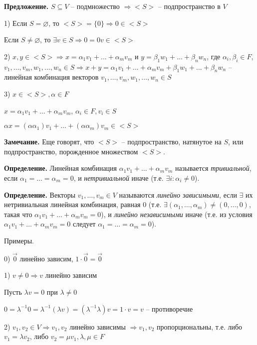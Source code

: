 \bigskip
\textbf{Предложение.} $S \subseteq V$ -- подмножество $\Rightarrow <S>$ -- подпространство в $V$

1) Если $S = \varnothing$, то $<S> = \{0\} \Rightarrow 0 \in <S>$

Если $S \neq \varnothing$, то $\exists v \in S \Rightarrow 0 = 0 v \in <S>$

2) $x, y \in <S> \Rightarrow x = \alpha_1 v_1 + \dots + \alpha_m v_m$ и $y = \beta_1 w_1 + \dots + \beta_n w_n$, где $\alpha_i, \beta_i \in F$, $v_1, \dots, v_m, w_1, \dots, w_n \in S \Rightarrow x + y = \alpha_1 v_1 + \dots + \alpha_m v_m + \beta_1 w_1 + \dots + \beta_n w_n$ -- линейная комбинация векторов $v_1, \dots, v_m, w_1, \dots, w_n \in S$

3) $x \in <S>, \alpha \in F$

$x = \alpha_1 v_1 + \dots + \alpha_m v_m$, $\alpha_i \in F, v_i \in S$

$\alpha x = (\alpha \alpha_1)v_1 + \dots + (\alpha \alpha_m) v_m \in <S>$

\bigskip
\textbf{Замечание.} Еще говорят, что $<S>$ -- подпространство, натянутое на $S$, или подпространство, порожденное множеством $<S>$.

\bigskip
\textbf{Определение.} Линейная комбинация $\alpha_1 v_1 + \dots + \alpha_m v_m$ называется \textit{тривиальной}, если $\alpha_1 = \dots = \alpha_m = 0$, и \textit{нетривиальной} иначе (т.е. $\exists i: \alpha_i \neq 0$).

\bigskip
\textbf{Определение.} Векторы $v_1, \dots, v_m \in V$ называются \textit{линейно зависимыми}, если $\exists$ их нетривиальная линейная комбинация, равная 0 (т.е. $\exists (\alpha_1, \dots, \alpha_m) \neq (0, \dots, 0)$, такая что $\alpha_1 v_1 + \dots + \alpha_m v_m = 0$), и \textit{линейно независимыми} иначе (т.е. из условия $\alpha_1 v_1 + \dots + \alpha_m v_m = 0$ следует $\alpha_1 = \dots = \alpha_m = 0$).

\bigskip
Примеры.

0) $\overrightarrow{0}$ линейно зависим, $1 \cdot \overrightarrow{0} = \overrightarrow{0}$

1) $v \neq 0 \Rightarrow v$ линейно зависим

Пусть $\lambda v = 0$ при $\lambda \neq 0$

$0 = \lambda^{-1} 0 = \lambda^{-1} (\lambda v) = (\lambda^{-1} \lambda) v = 1 \cdot v = v$ -- противоречие

2) $v_1, v_2 \in V \Rightarrow v_1, v_2$ линейно зависимы $\Rightarrow v_1, v_2$ пропорциональны, т.е. либо $v_1 = \lambda v_2$, либо $v_2 = \mu v_1, \lambda, \mu \in F$

